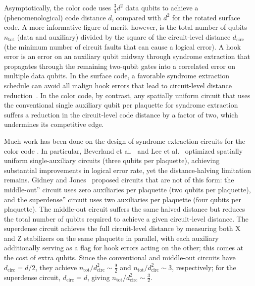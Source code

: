 \documentclass[twocolumn,
aps,
prx,
showpacs,
amsmath,
amssymb,
floatfix,
longbibliography,
superscriptaddress,
eprint]
{revtex4-1}
\begin{document}
Asymptotically, the color code uses $\frac{3}{4}d^2$ data qubits to achieve a (phenomenological) code distance $d$, compared with $d^2$ for the rotated surface code.
A more informative figure of merit, however, is the total number of qubits $n_{\mathrm{tot}}$ (data and auxiliary) divided by the square of the circuit-level distance $d_{\mathrm{circ}}$ (the minimum number of circuit faults that can cause a logical error).
A hook error is an error on an auxiliary qubit midway through syndrome extraction that propagates through the remaining two-qubit gates into a correlated error on multiple data qubits.
In the surface code, a favorable syndrome extraction schedule can avoid all malign hook errors that lead to circuit-level distance reduction~\cite{kishony2025surface}.
In the color code, by contrast, any spatially uniform circuit that uses the conventional single auxiliary qubit per plaquette for syndrome extraction suffers a reduction in the circuit-level code distance by a factor of two, which undermines its competitive edge.

Much work has been done on the design of syndrome extraction circuits for the color code \cite{Baireuther_2019, beverland2021cost, lee2025colorcode, gidney2023colorcode, yoshida2025lowdepthcolorcode, PRXQuantum.5.030352}.
In particular, Beverland et al.~\cite{beverland2021cost} and Lee et al.~\cite{lee2025colorcode} optimized spatially uniform single-auxiliary circuits (three qubits per plaquette), achieving substantial improvements in logical error rate, yet the distance-halving limitation remains.
Gidney and Jones~\cite{gidney2023colorcode} proposed circuits that are not of this form: the middle-out'' circuit uses zero auxiliaries per plaquette (two qubits per plaquette), and the superdense'' circuit uses two auxiliaries per plaquette (four qubits per plaquette).
The middle-out circuit suffers the same halved distance but reduces the total number of qubits required to achieve a given circuit-level distance.
The superdense circuit achieves the full circuit-level distance by measuring both X and Z stabilizers on the same plaquette in parallel, with each auxiliary additionally serving as a flag for hook errors acting on the other; this comes at the cost of extra qubits.
Since the conventional and middle-out circuits have $d_{\mathrm{circ}} = d/2$, they achieve $n_{\mathrm{tot}}/d_{\mathrm{circ}}^2 \sim \frac{9}{2}$ and $n_{\mathrm{tot}}/d_{\mathrm{circ}}^2 \sim 3$, respectively; for the superdense circuit, $d_{\mathrm{circ}} = d$, giving $n_{\mathrm{tot}}/d_{\mathrm{circ}}^2 \sim \frac{3}{2}$.
\end{document}
